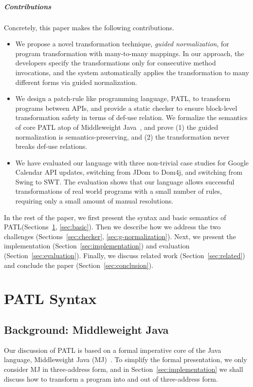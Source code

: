 \documentclass[letterpaper, USenglish]{lipics-v2016}
\newcommand{\PATL}{PATL\xspace}
\theoremstyle{plain}
\begin{document}
\subparagraph*{Contributions} Concretely, this paper makes the following contributions.
\begin{itemize}\itemsep-1pt
\item We propose a novel transformation technique, \emph{guided normalization}, for
  program transformation with many-to-many mappings. In our approach,
  the developers specify the transformations only for consecutive
  method invocations, and the system automatically applies the
  transformation to many different forms via guided normalization.
\item We design a patch-rule like programming language, \PATL, to
  transform programs between APIs, and provide a static checker to
  ensure block-level transformation safety in terms of def-use
  relation. We formalize the semantics of core \PATL atop of Middleweight
  Java~\cite{UCAM-CL-TR-563}, and prove (1) the guided normalization is semantics-preserving, and (2)
  the transformation never breaks def-use relations.
\item We have evaluated our language with three non-trivial case studies for Google Calendar API updates,
  switching from JDom to Dom4j, and switching from Swing to SWT.
  The evaluation shows that our language allows successful
  transformations of real world programs with a small number of rules,
  requiring only a small amount of manual resolutions.
\end{itemize}

In the rest of the paper, we first present the syntax and basic
semantics of \PATL (Sections~\ref{sec:syntax}, \ref{sec:basic}). Then we describe 
how we address the two challenges (Sections~\ref{sec:checker}, \ref{sec:g-normalization}).
Next, we present the implementation
(Section~\ref{sec:implementation}) and evaluation
(Section~\ref{sec:evaluation}). Finally, we discuss related work
(Section~\ref{sec:related}) and conclude the paper (Section~\ref{sec:conclusion}).


\section{\PATL Syntax}
\label{sec:syntax}

\subsection{Background: Middleweight Java}
Our discussion of \PATL is based on a formal imperative core
of the Java language, Middleweight Java (MJ)~\cite{UCAM-CL-TR-563}.
To simplify the formal presentation, we only consider MJ in three-address form, and in Section~\ref{sec:implementation} we
shall discuss how to transform a program into and out of three-address form.
\end{document}
